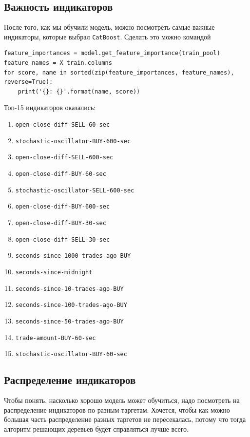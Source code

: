 \subsection{Важность индикаторов}
После того, как мы обучили модель, можно посмотреть самые важные индикаторы, которые выбрал \texttt{CatBoost}. Сделать это можно командой

\begin{verbatim}
feature_importances = model.get_feature_importance(train_pool)
feature_names = X_train.columns
for score, name in sorted(zip(feature_importances, feature_names), reverse=True):
    print('{}: {}'.format(name, score))
\end{verbatim}

Топ-15 индикаторов оказались:
\begin{enumerate}
\item \texttt{open-close-diff-SELL-60-sec}
\item \texttt{stochastic-oscillator-BUY-600-sec}
\item \texttt{open-close-diff-SELL-600-sec}
\item \texttt{open-close-diff-BUY-60-sec}
\item \texttt{stochastic-oscillator-SELL-600-sec}
\item \texttt{open-close-diff-BUY-600-sec}
\item \texttt{open-close-diff-BUY-30-sec}
\item \texttt{open-close-diff-SELL-30-sec}
\item \texttt{seconds-since-1000-trades-ago-BUY}
\item \texttt{seconds-since-midnight}
\item \texttt{seconds-since-10-trades-ago-BUY}
\item \texttt{seconds-since-100-trades-ago-BUY}
\item \texttt{seconds-since-50-trades-ago-BUY}
\item \texttt{trade-amount-BUY-60-sec}
\item \texttt{stochastic-oscillator-BUY-60-sec}
\end{enumerate}

\subsection{Распределение индикаторов}

Чтобы понять, насколько хорошо модель может обучиться, надо посмотреть на распределение индикаторов по разным таргетам. Хочется, чтобы как можно большая часть распределение разных таргетов не пересекалась, потому что тогда алгоритм решающих деревьев будет справляться лучше всего.

